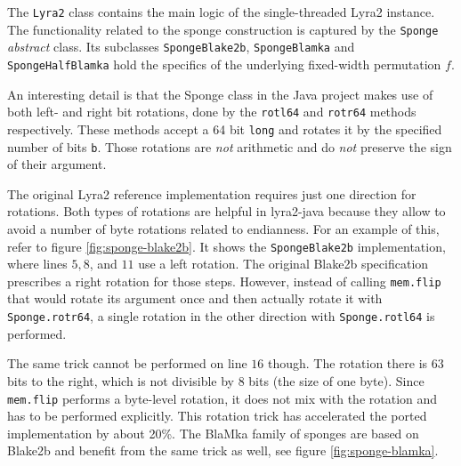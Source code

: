 The \texttt{Lyra2} class contains the main logic of the single-threaded Lyra2 instance. The functionality related to the sponge construction is captured by the \texttt{Sponge} \emph{abstract} class. Its subclasses \texttt{SpongeBlake2b}, \texttt{SpongeBlamka} and \texttt{SpongeHalfBlamka} hold the specifics of the underlying fixed-width permutation \(f\).

An interesting detail is that the Sponge class in the Java project makes use of both left- and right bit rotations, done by the \texttt{rotl64} and \texttt{rotr64} methods respectively. These methods accept a 64 bit \texttt{long} and rotates it by the specified number of bits \texttt{b}. Those rotations are \emph{not} arithmetic and do \emph{not} preserve the sign of their argument.

The original Lyra2 reference implementation requires just one direction for rotations. Both types of rotations are helpful in lyra2-java because they allow to avoid a number of byte rotations related to endianness. For an example of this,  refer to figure \ref{fig:sponge-blake2b}. It shows the \texttt{SpongeBlake2b} implementation, where lines \(5, 8\), and \(11\) use a left rotation. The original Blake2b specification prescribes a right rotation for those steps. However, instead of calling \texttt{mem.flip} that would rotate its argument once and then actually rotate it with \texttt{Sponge.rotr64}, a single rotation in the other direction with \texttt{Sponge.rotl64} is performed.

The same trick cannot be performed on line \(16\) though. The rotation there is \(63\) bits to the right, which is not divisible by 8 bits (the size of one byte). Since \texttt{mem.flip} performs a byte-level rotation, it does not mix with the rotation and has to be performed explicitly. This rotation trick has accelerated the ported implementation by about 20\%. The BlaMka family of sponges are based on Blake2b and benefit from the same trick as well, see figure \ref{fig:sponge-blamka}.

